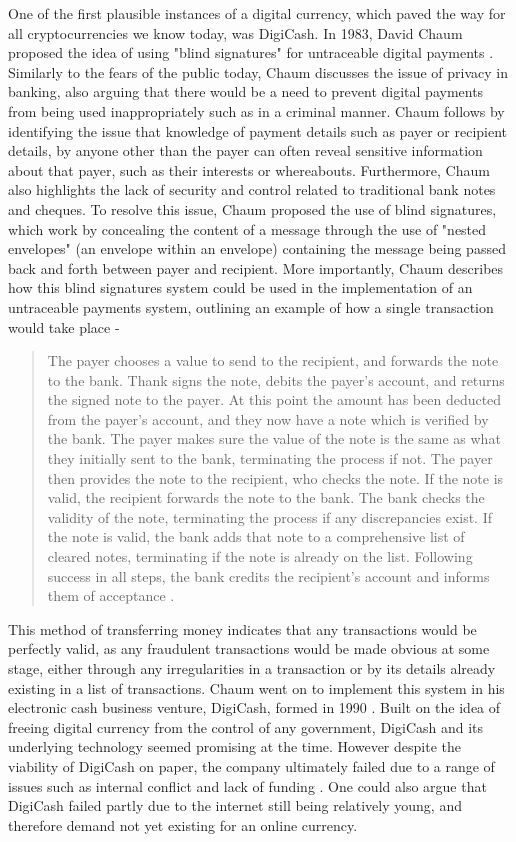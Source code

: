 One of the first plausible instances of a digital currency, which paved the way for all cryptocurrencies we know today, was DigiCash. In 1983, David Chaum proposed the idea of using "blind signatures" for untraceable digital payments \cite{chaum83}. Similarly to the fears of the public today, Chaum discusses the issue of privacy in banking, also arguing that there would be a need to prevent digital payments from being used inappropriately such as in a criminal manner. Chaum follows by identifying the issue that knowledge of payment details such as payer or recipient details, by anyone other than the payer can often reveal sensitive information about that payer, such as their interests or whereabouts. Furthermore, Chaum also highlights the lack of security and control related to traditional bank notes and cheques. To resolve this issue, Chaum proposed the use of blind signatures, which work by concealing the content of a message through the use of "nested envelopes" (an envelope within an envelope) containing the message being passed back and forth between payer and recipient. More importantly, Chaum describes how this blind signatures system could be used in the implementation of an untraceable payments system, outlining an example of how a single transaction would take place - 
\begin{quote}
    The payer chooses a value to send to the recipient, and forwards the note to the bank. Thank signs the note, debits the payer's account, and returns the signed note to the payer. At this point the amount has been deducted from the payer's account, and they now have a note which is verified by the bank. The payer makes sure the value of the note is the same as what they initially sent to the bank, terminating the process if not. The payer then provides the note to the recipient, who checks the note. If the note is valid, the recipient forwards the note to the bank. The bank checks the validity of the note, terminating the process if any discrepancies exist. If the note is valid, the bank adds that note to a comprehensive list of cleared notes, terminating if the note is already on the list. Following success in all steps, the bank credits the recipient's account and informs them of acceptance \cite{chaum83}.
\end{quote}

This method of transferring money indicates that any transactions would be perfectly valid, as any fraudulent transactions would be made obvious at some stage, either through any irregularities in a transaction or by its details already existing in a list of transactions. Chaum went on to implement this system in his electronic cash business venture, DigiCash, formed in 1990 \cite{digicash}. Built on the idea of freeing digital currency from the control of any government, DigiCash and its underlying technology seemed promising at the time. However despite the viability of DigiCash on paper, the company ultimately failed due to a range of issues such as internal conflict and lack of funding \cite{digicrash}. One could also argue that DigiCash failed partly due to the internet still being relatively young, and therefore demand not yet existing for an online currency.

